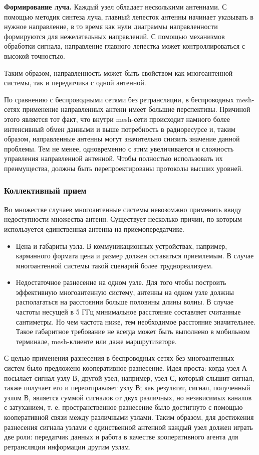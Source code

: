 \documentclass[14pt,a4paper,titlepage]{extarticle}
\begin{document}
\textbf{Формирование луча.} Каждый узел обладает несколькими антеннами. С помощью методик синтеза луча, главный лепесток антенны начинает указывать в нужное направление, в то время как нули диаграммы направленности формируются для нежелательных направлений. С помощью механизмов обработки сигнала, направление главного лепестка может контроллироваться с высокой точностью.

Таким образом, направленность может быть свойством как многоантенной системы, так и передатчика с одной антенной. 

По сравнению с беспроводными сетями без ретрансляции, в беспроводных mesh-сетях применение направленных антенн имеет большие перспективы. Причиной этого является тот факт, что внутри mesh-сети происходит намного более интенсивный обмен данными и выше потребность в радиоресурсе и, таким образом, направленные антенны могут значительно снизить значение данной проблемы. Тем не менее, одновременно с этим увеличивается и сложность управления направленной антенной. Чтобы полностью использовать их преимущества, должны быть перепроектированы протоколы высших уровней. 

\subsubsection{Коллективный прием}
Во множестве случаев многоантенные системы невозомжно применить ввиду недоступности множества антенн. Существует несколько причин, по которым используется единственная антенна на приемопередатчике.
\begin{itemize}
\item Цена и габариты узла. В коммуникационных устройствах, например, карманного формата цена и размер должен оставаться приемлемым. В случае многоантенной системы такой сценарий более труднореализуем.
\item Недостаточное разнесение на одном узле. Для того чтобы построить эффективную многоантенную систему, антенны на одном узле должны располагаться на расстоянии больше половины длины волны. В случае частоты несущей в 5 ГГц минимальное расстояние составляет считанные сантиметры. Но чем частота ниже, тем необходимое расстояние значительнее. Такое габаритное требование не всегда может быть выполнено в мобильном терминале, mesh-клиенте или даже маршрутизаторе.
\end{itemize}

С целью применения разнесения в беспроводных сетях без многоантенных систем было предложено кооперативное разнесение. Идея проста: когда узел А посылает сигнал узлу В, другой узел, например, узел С, который слышит сигнал, также получает его и переотправляет узлу В; как результат, сигнал, полученный узлом В, является суммой сигналов от двух различных, но независимых каналов с затуханием, т. е. пространственное разнесение было достигнуто с помощью кооперативной связи между различными узлами. Таким образом, для достижения разнесения сигнала узлами с единственной антенной каждый узел должен играть две роли: передатчик данных и работа в качестве кооперативного агента для ретрансляции информации другим узлам. 
\end{document}
